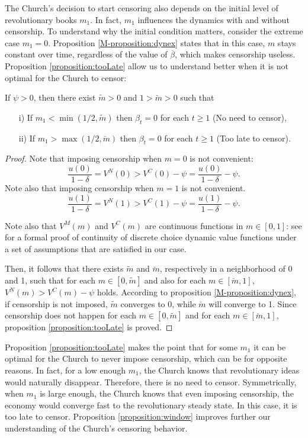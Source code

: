 The Church's decision to start censoring also depends on the initial level of revolutionary books $m_{1}$. In fact, $m_{1}$ influences the dynamics with and without censorship. To understand why the initial condition matters, consider the extreme case $m_{1}=0$. Proposition \ref{M-proposition:dynex} states that in this case, $m$ stays constant over time, regardless of the value of $\overline{\beta}$, which makes censorship useless.
Proposition \ref{proposition:tooLate} allow us to understand better when it is not optimal for the Church to censor:
\begin{proposition}
\label{proposition:tooLate}
If $\psi>0$, then there exist $\tilde{m}>0$ and $1>\breve{m}>0$ such that
\begin{itemize}
\item[i)] If $m_1<\min(1/2,\tilde{m})$ then $\beta_t=0$ for each $t\geq1$ (No need to censor),
\item[ii)] If $m_1>\max(1/2,\breve{m})$ then $\beta_t=0$ for each $t\geq1$ (Too late to censor).
\end{itemize}
\end{proposition}
\begin{proof}  Note that imposing censorship when $m=0$ is not convenient: $$\frac{u(0)}{1-\delta}=V^N(0)>V^C(0)-\psi=\frac{u(0)}{1-\delta}-\psi.$$
 Note also that imposing censorship when $m=1$ is not convenient. $$\frac{u(1)}{1-\delta}=V^N(1)>V^C(1)-\psi=\frac{u(1)}{1-\delta}-\psi.$$

Note also that $V^M(m)$ and $V^C(m)$ are continuous functions in $m\in[0,1]$: see  for a formal proof of continuity of discrete choice dynamic value functions under a set of assumptions that are satisfied in our case.

Then, it follows that there exists $\tilde{m}$ and $\breve{m}$, respectively in a neighborhood of 0 and 1, such that for each $ m\in[0,\tilde{m}]$ and also for each $m\in[\breve{m},1]$, $V^N(m)>V^C(m)-\psi$ holds. According to proposition \ref{M-proposition:dynex}, if censorship is not imposed, $\tilde{m}$ converges to 0, while $\breve{m}$ will converge to 1. Since censorship does not happen for each $m\in[0,\tilde{m}]$ and for each $m\in[\breve{m},1]$, proposition \ref{proposition:tooLate} is proved.
\end{proof}

Proposition \ref{proposition:tooLate} makes the point that for some $m_{1}$ it can be optimal for the Church  to never impose censorship, which can be for opposite reasons. In fact, for a low enough $m_{1}$, the Church knows that revolutionary ideas would naturally disappear. Therefore, there is no need to censor. Symmetrically, when $m_{1}$ is large enough, the Church knows that even imposing censorship, the economy would converge fast to the revolutionary steady state. In this case, it is too late to censor. Proposition \ref{proposition:window} improves further our understanding of the Church's censoring behavior.

